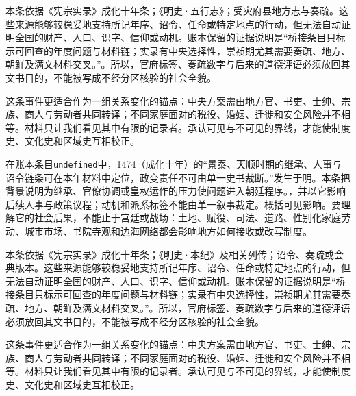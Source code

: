 本条依据《宪宗实录》成化十年条；《明史·五行志》；受灾府县地方志与奏疏。这些来源能够较稳妥地支持所记年序、诏令、任命或特定地点的行动，但无法自动证明全国的财产、人口、识字、信仰或动机。账本保留的证据说明是“桥接条目只标示可回查的年度问题与材料链；实录有中央选择性，崇祯期尤其需要奏疏、地方、朝鲜及满文材料交叉。”。所以，官府标签、奏疏数字与后来的道德评语必须放回其文书目的，不能被写成不经分区核验的社会全貌。

这条事件更适合作为一组关系变化的锚点：中央方案需由地方官、书吏、士绅、宗族、商人与劳动者共同转译；不同家庭面对的税役、婚姻、迁徙和安全风险并不相等。材料只让我们看见其中有限的记录者。承认可见与不可见的界线，才能使制度史、文化史和区域史互相校正。

在账本条目\texttt{undefined}中，1474（成化十年）的“景泰、天顺时期的继承、人事与诏令链条可在本年材料中定位，政变责任不可由单一史书裁断。”发生于明。本条把背景说明为继承、官僚协调或皇权运作的压力使问题进入朝廷程序。，并以它影响后续人事与政策议程；动机和派系标签不能由单一叙事裁定。概括可见影响。要理解它的社会后果，不能止于宫廷或战场：土地、赋役、司法、道路、性别化家庭劳动、城市市场、书院寺观和边海网络都会影响地方如何接收或改写制度。

本条依据《宪宗实录》成化十年条；《明史·本纪》及相关列传；诏令、奏疏或会典版本。这些来源能够较稳妥地支持所记年序、诏令、任命或特定地点的行动，但无法自动证明全国的财产、人口、识字、信仰或动机。账本保留的证据说明是“桥接条目只标示可回查的年度问题与材料链；实录有中央选择性，崇祯期尤其需要奏疏、地方、朝鲜及满文材料交叉。”。所以，官府标签、奏疏数字与后来的道德评语必须放回其文书目的，不能被写成不经分区核验的社会全貌。

这条事件更适合作为一组关系变化的锚点：中央方案需由地方官、书吏、士绅、宗族、商人与劳动者共同转译；不同家庭面对的税役、婚姻、迁徙和安全风险并不相等。材料只让我们看见其中有限的记录者。承认可见与不可见的界线，才能使制度史、文化史和区域史互相校正。
